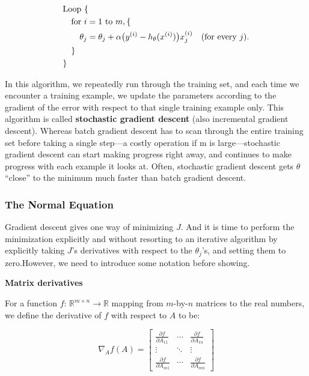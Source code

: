 \documentclass[fontset=windows,pass]{article}
\numberwithin{equation}{subsection} %
\begin{document}
\[
\begin{aligned}
&\text{Loop } \{ \\
&\quad \text{for } i = 1 \text{ to } m, \{ \\
&\quad \quad \theta_j = \theta_j + \alpha \big(y^{(i)} - h_\theta(x^{(i)})\big) x_j^{(i)} \quad \text{(for every \( j \))}. \\
&\quad \} \\
&\}
\end{aligned}
\]

In this algorithm, we repeatedly run through the training set, and each time we encounter a training example, 
we update the parameters according to the gradient of the error with respect to that single training example only.
This algorithm is called \textbf{stochastic gradient descent} (also incremental gradient descent).
Whereas batch gradient descent has to scan through the entire training set before taking a single step—a costly operation 
if m is large—stochastic gradient descent can start making progress right away, and continues to make progress with each example it looks at. 
Often, stochastic gradient descent gets $\theta$ “close” to the minimum much faster than batch gradient descent.

\subsubsection{The Normal Equation}

Gradient descent gives one way of minimizing $J$. And it is time to perform the minimization explicitly and
without resorting to an iterative algorithm by explicitly taking $J$'s derivatives with respect to the $\theta_j$'s, and setting them to
zero.However, we need to introduce some notation before showing.

\begin{flushleft}
	{\Large \textbf{Matrix derivatives}}
\end{flushleft}

For a function $f$: $\mathbb{R}^{m \times n} \to \mathbb{R}$ mapping from $m$-by-$n$ matrices to the real numbers,
we define the derivative of $f$ with respect to $A$ to be:

\begin{equation}
	\nabla_A f(A) = 
	\begin{bmatrix}
	\frac{\partial f}{\partial A_{11}} & \cdots & \frac{\partial f}{\partial A_{1n}} \\
	\vdots & \ddots & \vdots \\
	\frac{\partial f}{\partial A_{m1}} & \cdots & \frac{\partial f}{\partial A_{mn}}
	\end{bmatrix}
\end{equation}
\end{document}
